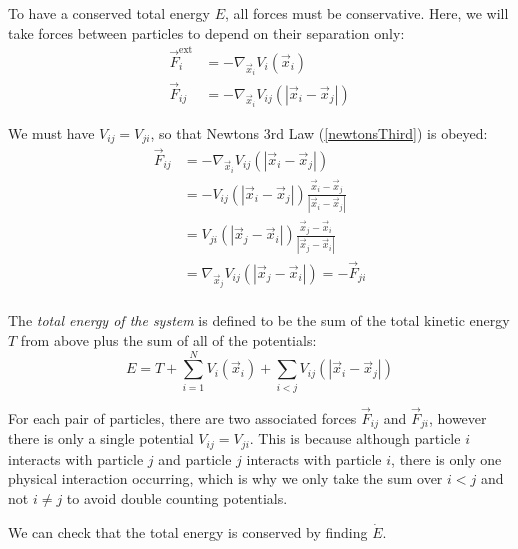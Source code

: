 \documentclass[../main.tex]{subfiles}
\begin{document}
To have a conserved total energy $E$, all forces must be conservative.
Here, we will take forces between particles to depend on their separation only:
\begin{align*}
  \vec{F}^{\text{ext}}_i &= -\nabla_{\vec{x}_i} V_i(\vec{x}_i) \\
  \vec{F}_{i j} &= -\nabla_{\vec{x}_i} V_{i j}(|\vec{x}_i  - \vec{x}_j|)
\end{align*}
\begin{remark}[Note]
  We must have $V_{i j} = V_{j i}$, so that Newtons 3rd Law (\cref{newtonsThird}) is obeyed:
  \begin{align*}
    \vec{F}_{i j} &= - \nabla_{\vec{x}_i} V_{i j}(|\vec{x}_i - \vec{x}_j|) \\
                  &= - V_{i j}(|\vec{x}_i - \vec{x}_j|)\frac{\vec{x}_i - \vec{x}_j}{|\vec{x}_i - \vec{x}_j|} \\
                  &= V_{j i}(|\vec{x}_j - \vec{x}_i|)\frac{\vec{x}_j - \vec{x}_i}{|\vec{x}_j - \vec{x}_i|} \\
                  &= \nabla_{\vec{x}_j}V_{i j}(|\vec{x}_j - \vec{x}_i|) = -\vec{F}_{j i} \\
  \end{align*}
\end{remark}
\begin{definition}
  The \textit{total energy of the system} is defined to be the sum of the total kinetic energy $T$ from above plus the sum of all of the potentials:
  \label{totalEnergy}
  \[
    E = T + \sum_{i = 1}^{N} V_i(\vec{x}_i) + \sum_{i < j} V_{i j}(|\vec{x}_i - \vec{x}_j|)
  \]
\end{definition}
\begin{remark}[Note]
  For each pair of particles, there are two associated forces $\vec{F}_{ij}$ and $\vec{F}_{ji}$, however there is only a single potential $V_{i j} = V_{j i}$.
  This is because although particle $i$ interacts with particle $j$ and particle $j$ interacts with particle $i$, there is only one physical interaction occurring, which is why we only take the sum over $i < j$ and not $i \neq j$ to avoid double counting potentials.
\end{remark}

We can check that the total energy is conserved by finding $\dot{E}$.
\end{document}
